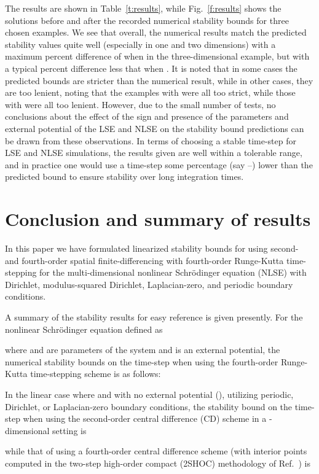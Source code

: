 \documentclass{article}
\begin{document}
{The results are shown in Table~\ref{t:results}, while Fig.~\ref{f:results} shows the solutions before and after the recorded numerical stability bounds for three chosen examples.
We see that overall, the numerical results match the predicted stability 
values quite well (especially in one and two dimensions) with a maximum 
percent difference of  when  in the three-dimensional
example, but with a typical percent difference less that  when 
.  
It is noted that in some cases the predicted bounds are stricter than the numerical result, while in other cases, they are too lenient, noting that the examples with  were all too strict, while those with  were all too lenient.  However, due to the small number of tests, no conclusions about the effect of the sign and presence of the parameters and external potential of the LSE and NLSE on the stability bound predictions can be drawn from these observations.  
In terms of choosing a stable time-step for LSE and NLSE simulations, the results given are well within a tolerable range, and in practice one would use a time-step some percentage (say --) lower than the predicted bound to ensure stability over long integration times.

\section{Conclusion and summary of results}
\label{s:sum}
In this paper we have formulated linearized stability bounds for using second- and fourth-order spatial finite-differencing with fourth-order Runge-Kutta time-stepping for the multi-dimensional nonlinear Schr{\"o}dinger equation (NLSE) with Dirichlet, modulus-squared Dirichlet, Laplacian-zero, and periodic boundary conditions.  

A summary of the stability results for easy reference is given presently.  For the nonlinear Schr{\"o}dinger equation defined as 

where  and  are parameters of the system and  is an external potential, the numerical stability bounds on the time-step when using the fourth-order Runge-Kutta time-stepping scheme is as follows: 

In the linear case where  and with no external potential (), utilizing periodic, Dirichlet, or Laplacian-zero boundary conditions, the stability bound on the time-step  when using the second-order central difference (CD) scheme in a -dimensional setting is 

while that of using a fourth-order central difference scheme (with interior points computed in the two-step high-order compact (2SHOC) methodology of Ref.~\cite{ME_2SHOC}) is

}
\end{document}
